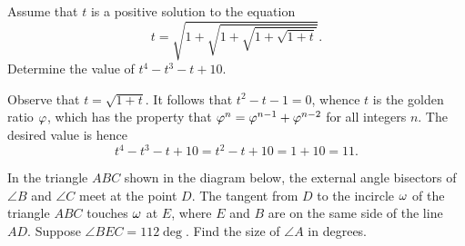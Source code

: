 \clearpage
\begin{question}[11]\label{A::2022-O-1-14}
    Assume that $t$ is a positive solution to the equation \[t = \sqrt{1 + \sqrt{1 + \sqrt{1 + \sqrt{1 + t}}}}.\] Determine the value of $t^4 - t^3 - t + 10$.
\end{question}
\begin{solution*}
    Observe that $t = \sqrt{1 + t}$. It follows that $t^2 - t - 1 = 0$, whence $t$ is the golden ratio $\varphi$, which has the property that $\varphi^n = \varphi^{n-1} + \varphi^{n-2}$ for all integers $n$. The desired value is hence \[t^4 - t^3 - t + 10 = t^2 - t + 10 = 1 + 10 = 11.\]
\end{solution*}

\begin{question}[44]\label{A::2022-O-1-15}
    In the triangle $ABC$ shown in the diagram below, the external angle bisectors of $\angle B$ and $\angle C$ meet at the point $D$. The tangent from $D$ to the incircle $\omega$ of the triangle $ABC$ touches $\omega$ at $E$, where $E$ and $B$ are on the same side of the line $AD$. Suppose $\angle BEC = 112\deg$. Find the size of $\angle A$ in degrees.

    \begin{center}
    \end{center}
\end{question}
